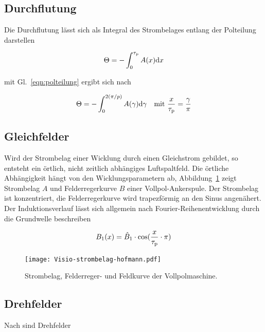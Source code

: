 \subsection{Durchflutung}\label{sec:durchflutung}

Die Durchflutung lässt sich als Integral des Strombelages entlang der Polteilung darstellen

\begin{align}
\Theta = -\int_0^{\tau_{\mathrm{p}}} A(x)\mathrm{d}x
\end{align}

mit Gl.~\ref{eqn:polteilung} ergibt sich nach \textcite[S.~200]{hofmann2013}

\begin{align}
\Theta = - \int_0^{2(\pi /p)} A(\gamma)\mathrm{d}\gamma \quad \text{mit}\,\, \frac{x}{\tau_{\mathrm{p}}}=\frac{\gamma}{\pi}
\end{align}

\subsection{Gleichfelder}\label{sec:gleichfelder}

Wird der Strombelag einer Wicklung durch einen Gleichstrom gebildet, so entsteht ein örtlich, nicht zeitlich abhängiges Luftspaltfeld.
Die örtliche Abhängigkeit hängt von den Wicklungsparametern ab, Abbildung~\ref{fig:Visio-strombelag-hofmann} zeigt Strombelag $A$ und Felderregerkurve $B$ einer Vollpol-Ankerspule.
Der Strombelag ist konzentriert, die Felderregerkurve wird trapezförmig an den Sinus angenähert.
Der Induktionsverlauf lässt sich allgemein nach Fourier-Reihenentwicklung durch die Grundwelle beschreiben

\begin{align}
B_{\mathrm{1}}(x) = \hat{B}_{\mathrm{1}}\cdot\cos(\frac{x}{\tau_{\mathrm{p}}}\cdot \pi)
\end{align}

\begin{figure}[h!]
\centering
\texttt{[image: Visio-strombelag-hofmann.pdf]}
\label{fig:Visio-strombelag-hofmann}
\caption{Strombelag, Felderreger- und Feldkurve der Vollpolmaschine.}
\end{figure}

\subsection{Drehfelder}\label{sec:drehfelder}

Nach \textcite{hofmann2013} sind Drehfelder

